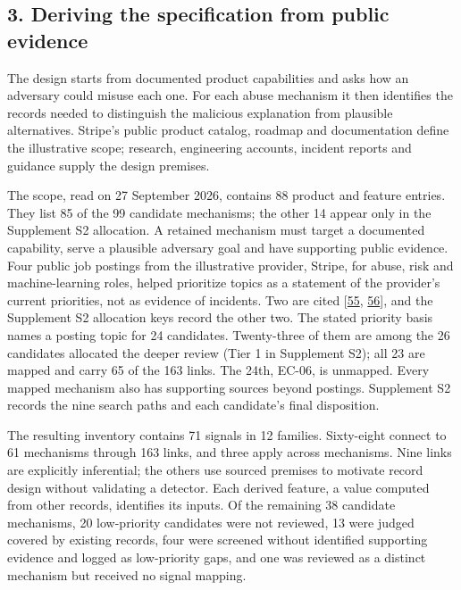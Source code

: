 \documentclass[
  11pt,
]{article}
\begin{document}
\FloatBarrier

\hypertarget{deriving-the-specification-from-public-evidence}{%
\subsection{3. Deriving the specification from public
evidence}\label{deriving-the-specification-from-public-evidence}}

\suppressfloats[t]

The design starts from documented product capabilities and asks how an
adversary could misuse each one. For each abuse mechanism it then
identifies the records needed to distinguish the malicious explanation
from plausible alternatives. Stripe's public product catalog, roadmap
and documentation define the illustrative scope; research, engineering
accounts, incident reports and guidance supply the design premises.

The scope, read on 27 September 2026, contains 88 product and feature
entries. They list 85 of the 99 candidate mechanisms; the other 14
appear only in the Supplement S2 allocation. A retained mechanism must
target a documented capability, serve a plausible adversary goal and
have supporting public evidence. Four public job postings from the
illustrative provider, Stripe, for abuse, risk and machine-learning
roles, helped prioritize topics as a statement of the provider's current
priorities, not as evidence of incidents. Two are cited
{[}\protect\hyperlink{ref-Stripe2026}{55},
\protect\hyperlink{ref-StripeARE2026}{56}{]}, and the Supplement S2
allocation keys record the other two. The stated priority basis names a
posting topic for 24 candidates. Twenty-three of them are among the 26
candidates allocated the deeper review (Tier 1 in Supplement S2); all 23
are mapped and carry 65 of the 163 links. The 24th, \mbox{EC-06}, is
unmapped. Every mapped mechanism also has supporting sources beyond
postings. Supplement S2 records the nine search paths and each
candidate's final disposition.

The resulting inventory contains 71 signals in 12 families. Sixty-eight
connect to 61 mechanisms through 163 links, and three apply across
mechanisms. Nine links are explicitly inferential; the others use
sourced premises to motivate record design without validating a
detector. Each derived feature, a value computed from other records,
identifies its inputs. Of the remaining 38 candidate mechanisms, 20
low-priority candidates were not reviewed, 13 were judged covered by
existing records, four were screened without identified supporting
evidence and logged as low-priority gaps, and one was reviewed as a
distinct mechanism but received no signal mapping.
\end{document}
